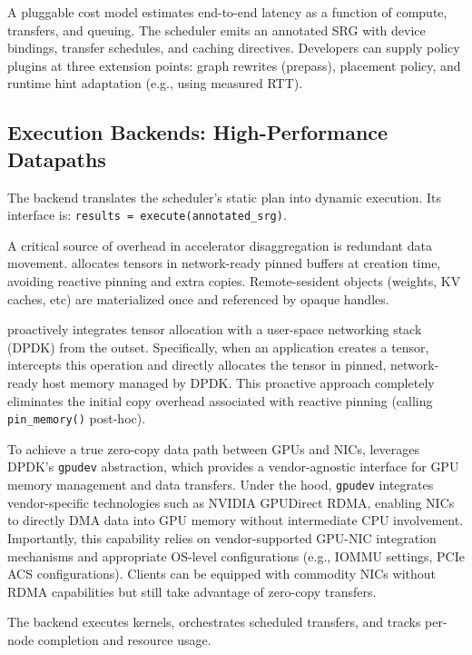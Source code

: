 A pluggable cost model estimates end-to-end latency as a function of compute, transfers, and queuing.
The scheduler emits an annotated SRG with device bindings, transfer schedules, and caching directives.
Developers can supply policy plugins at three extension points: graph rewrites (prepass), placement policy, and runtime hint adaptation (e.g., using measured RTT).


\subsection{Execution Backends: High-Performance Datapaths}
\label{ssec:zerocopy}

The backend translates the scheduler's static plan into dynamic execution. Its interface is:
\texttt{results = execute(anno\-tated\_srg)}.

A critical source of overhead in accelerator disaggregation is redundant data movement. 
\sys allocates tensors in network-ready pinned buffers at creation time, avoiding reactive pinning and extra copies.
Remote-sesident objects (weights, KV caches, etc) are materialized once and referenced by opaque handles.

\sys proactively integrates tensor allocation with a user-space networking stack (DPDK) from the outset. 
Specifically, when an application creates a tensor, \sys intercepts this operation and directly allocates the tensor in pinned, network-ready host memory managed by DPDK. 
This proactive approach completely eliminates the initial copy overhead associated with reactive pinning (calling \texttt{pin\_memory()} post-hoc).

To achieve a true zero-copy data path between GPUs and NICs, \sys leverages DPDK's \texttt{gpudev} abstraction, which provides a vendor-agnostic interface for GPU memory management and data transfers.
Under the hood, \texttt{gpudev} integrates vendor-specific technologies such as NVIDIA GPUDirect RDMA, enabling NICs to directly DMA data into GPU memory without intermediate CPU involvement.
Importantly, this capability relies on vendor-supported GPU-NIC integration mechanisms and appropriate OS-level configurations (e.g., IOMMU settings, PCIe ACS configurations).
Clients can be equipped with commodity NICs without RDMA capabilities but still take advantage of zero-copy transfers.

The backend executes kernels, orchestrates scheduled tran\-sfers, and tracks per-node completion and resource usage.

